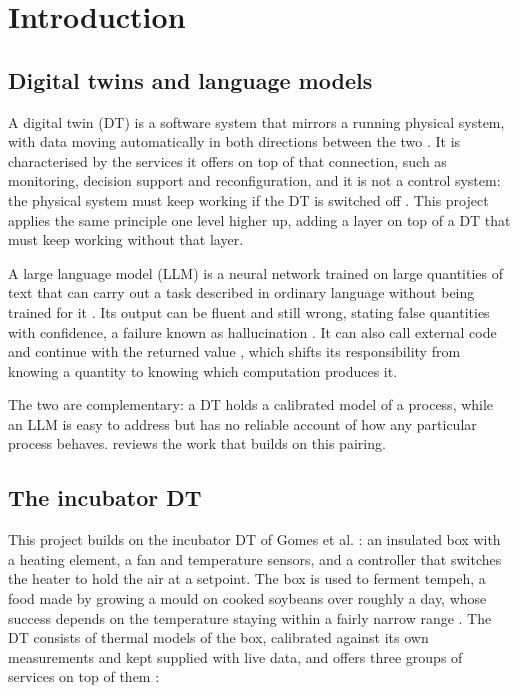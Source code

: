   \section{Introduction}
  \label{sec:introduction}

  \subsection{Digital twins and language models}
  \label{sec:background}

  A digital twin (DT) is a software system that mirrors a running physical system, with data
  moving automatically in both directions between the two
  \cite{fuller2020digitaltwin,kritzinger2018digitaltwin}. It is characterised by the services it
  offers on top of that connection, such as monitoring, decision support and reconfiguration, and
  it is not a control system: the physical system must keep working if the DT is switched off
  \cite{gomes2025incubator}. This project applies the same principle one level higher up, adding a
  layer on top of a DT that must keep working without that layer.

  A large language model (LLM) is a neural network trained on large quantities of text that can
  carry out a task described in ordinary language without being trained for it
  \cite{brown2020fewshot}. Its output can be fluent and still wrong, stating false quantities with
  confidence, a failure known as hallucination \cite{ji2023hallucination}. It can also call
  external code and continue with the returned value \cite{schick2023toolformer}, which shifts its
  responsibility from knowing a quantity to knowing which computation produces it.

  The two are complementary: a DT holds a calibrated model of a process, while an LLM is easy to
  address but has no reliable account of how any particular process behaves. 
  reviews the work that builds on this pairing.


  \subsection{The incubator DT}
  \label{sec:incubator-dt}

  This project builds on the incubator DT of Gomes et al. \cite{gomes2025incubator}: an insulated
  box with a heating element, a fan and temperature sensors, and a controller that switches the
  heater to hold the air at a setpoint. The box is used to ferment tempeh, a food made by growing a
  mould on cooked soybeans over roughly a day, whose success depends on the temperature staying
  within a fairly narrow range \cite{steinkraus1960tempeh,tempehinfo_temperature}. The DT consists
  of thermal models of the box, calibrated against its own measurements and kept supplied with live
  data, and offers three groups of services on top of them \cite{gomes2025incubator}:

